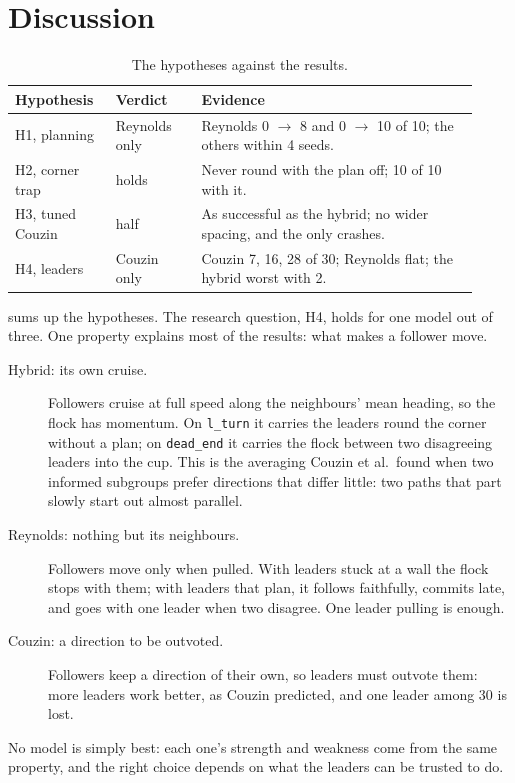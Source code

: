 \section{Discussion}
\label{sec:discussion}

\begin{table}[tbp]
  \centering
  \small
  \begin{tabular}{@{}>{\raggedright\arraybackslash}p{0.2\linewidth}
                     >{\raggedright\arraybackslash}p{0.17\linewidth}
                     >{\raggedright\arraybackslash}p{0.55\linewidth}@{}}
    \toprule
    Hypothesis & Verdict & Evidence \\
    \midrule
    H1, planning & Reynolds only &
      Reynolds 0 $\to$ 8 and 0 $\to$ 10 of 10; the others within 4 seeds. \\
    H2, corner trap & holds &
      Never round with the plan off; 10 of 10 with it. \\
    H3, tuned Couzin & half &
      As successful as the hybrid; no wider spacing, and the only crashes. \\
    H4, leaders & Couzin only &
      Couzin 7, 16, 28 of 30; Reynolds flat; the hybrid worst with 2. \\
    \bottomrule
  \end{tabular}
  \caption{The hypotheses against the results.}
  \label{tab:verdicts}
\end{table}

 sums up the hypotheses. The research question, H4, holds
for one model out of three. One property explains most of the results: what
makes a follower move.
\begin{description}
  \item[Hybrid: its own cruise.] Followers cruise at full speed along the
    neighbours' mean heading, so the flock has momentum. On \texttt{l\_turn}
    it carries the leaders round the corner without a plan; on
    \texttt{dead\_end} it carries the flock between two disagreeing leaders
    into the cup. This is the averaging Couzin et al.\ found when two
    informed subgroups prefer directions that differ little: two paths that
    part slowly start out almost parallel.
  \item[Reynolds: nothing but its neighbours.] Followers move only when
    pulled. With leaders stuck at a wall the flock stops with them; with
    leaders that plan, it follows faithfully, commits late, and goes with one
    leader when two disagree. One leader pulling is enough.
  \item[Couzin: a direction to be outvoted.] Followers keep a direction of
    their own, so leaders must outvote them: more leaders work better, as
    Couzin predicted, and one leader among 30 is lost.
\end{description}
No model is simply best: each one's strength and weakness come from the same
property, and the right choice depends on what the leaders can be trusted to
do.

